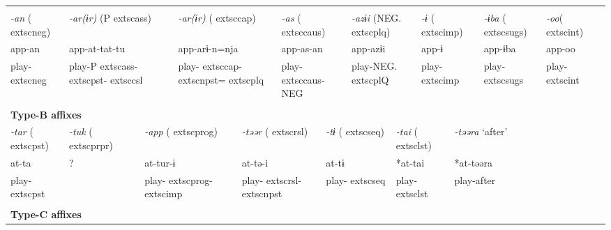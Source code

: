 \tabletail{}
\tablelasttail{}
\begin{tabularx}{\textwidth}{XXXXXXXXXXXXXXXXXXXXXXX}
\lsptoprule
\multicolumn{23}{X}{{\bfseries Type-A affixes}}\\
{ \textit{{}-an} (	extsc{neg})} & \multicolumn{6}{X}{{ \textit{{}-ar(ɨr)} (P	extsc{ass})}} & \multicolumn{3}{X}{{ \textit{{}-ar(ɨr)} (	extsc{cap})}} & \multicolumn{4}{X}{{ \textit{{}-as} (	extsc{caus})}} & \multicolumn{4}{X}{{ \textit{{}-azɨi} (NEG.	extsc{plq})}} & \multicolumn{2}{X}{{ \textit{{}-ɨ} (	extsc{imp})}} & { \textit{{}-ɨba} (	extsc{sugs})} & { \textit{{}-oo}(	extsc{int})} & \\
{ app-an} & \multicolumn{6}{X}{{ app-at-tat-tu}} & \multicolumn{3}{X}{{ app-arɨ-n=nja}} & \multicolumn{4}{X}{{ app-as-an}} & \multicolumn{4}{X}{{ app-azɨi}} & \multicolumn{2}{X}{{ app-ɨ}} & { app-ɨba} & { app-oo} & \\
play-	extsc{neg} & \multicolumn{6}{X}{play-P	extsc{ass}-	extsc{pst}-	extsc{csl}} & \multicolumn{3}{X}{play-	extsc{cap}-	extsc{npst}=	extsc{plq}} & \multicolumn{4}{X}{play-	extsc{caus}-NEG} & \multicolumn{4}{X}{play-NEG.	extsc{pl}Q} & \multicolumn{2}{X}{play-	extsc{imp}} & play-	extsc{sugs} & play-	extsc{int} & \\
\multicolumn{23}{X}{}\\
\multicolumn{23}{X}{{\bfseries Type-B affixes}}\\
{ \textit{{}-tar} (	extsc{pst})} & \multicolumn{3}{X}{{ \textit{{}-tuk} (	extsc{prpr})}} & \multicolumn{5}{X}{{ \textit{{}-app} (	extsc{prog})}} & \multicolumn{4}{X}{{ \textit{{}-təər} (	extsc{rsl})}} & \multicolumn{3}{X}{{ \textit{{}-tɨ} (	extsc{seq})}} & \multicolumn{3}{X}{{ \textit{{}-tai} (	extsc{lst})}} & \multicolumn{4}{X}{{ \textit{{}-təəra} ‘after’}}\\
{ at-ta} & \multicolumn{3}{X}{{ ?}} & \multicolumn{5}{X}{{ at-tur-ɨ}} & \multicolumn{4}{X}{{ at-tə-i}} & \multicolumn{3}{X}{{ at-tɨ}} & \multicolumn{3}{X}{{ *at-tai}} & \multicolumn{4}{X}{{ *at-təəra}}\\
play-	extsc{pst} & \multicolumn{3}{X}{} & \multicolumn{5}{X}{play-	extsc{prog}-	extsc{imp}} & \multicolumn{4}{X}{play-	extsc{rsl}-	extsc{npst}} & \multicolumn{3}{X}{play-	extsc{seq}} & \multicolumn{3}{X}{play-	extsc{lst}} & \multicolumn{4}{X}{{ play-after}}\\
& \multicolumn{3}{X}{} & \multicolumn{5}{X}{} & \multicolumn{4}{X}{} & \multicolumn{3}{X}{} & \multicolumn{3}{X}{} & \multicolumn{4}{X}{}\\
\multicolumn{23}{X}{{\bfseries Type-C affixes}}\\

\end{tabularx}
